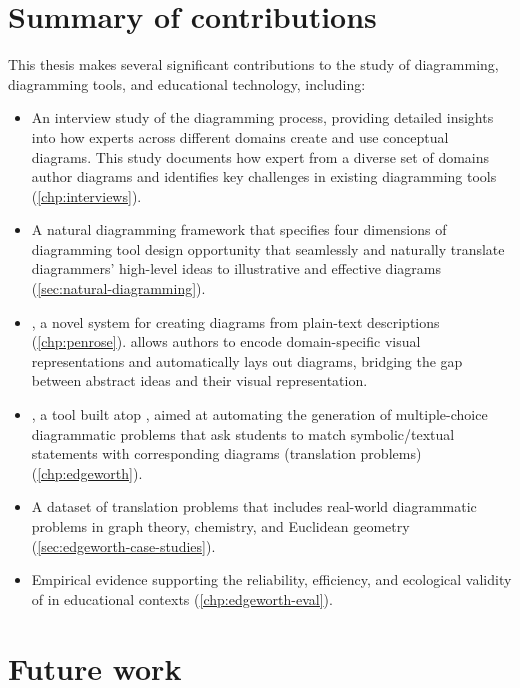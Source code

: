 \section{Summary of contributions}

This thesis makes several significant contributions to the study of diagramming, diagramming tools, and educational technology, including:

\begin{itemize}

    \item An interview study of the diagramming process, providing detailed insights into how experts across different domains create and use conceptual diagrams. This study documents how expert from a diverse set of domains author diagrams and identifies key challenges in existing diagramming tools (\cref{chp:interviews}).

    \item A natural diagramming framework that specifies four dimensions of diagramming tool design opportunity that seamlessly and naturally translate diagrammers’ high-level ideas to illustrative and effective diagrams (\cref{sec:natural-diagramming}).
    
    \item \Penrose, a novel system for creating diagrams from plain-text descriptions (\cref{chp:penrose}). \Penrose allows authors to encode domain-specific visual representations and automatically lays out diagrams, bridging the gap between abstract ideas and their visual representation.
    
    \item \Edgeworth, a tool built atop \Penrose, aimed at automating the generation of multiple-choice diagrammatic problems that ask students to match symbolic/textual statements with corresponding diagrams (\ie translation problems) (\cref{chp:edgeworth}). 
    
    \item A dataset of translation problems that includes real-world diagrammatic problems in graph theory, chemistry, and Euclidean geometry (\cref{sec:edgeworth-case-studies}).
    
    \item Empirical evidence supporting the reliability, efficiency, and ecological validity of \Edgeworth in educational contexts (\cref{chp:edgeworth-eval}). 
    
\end{itemize}


\section{Future work}

